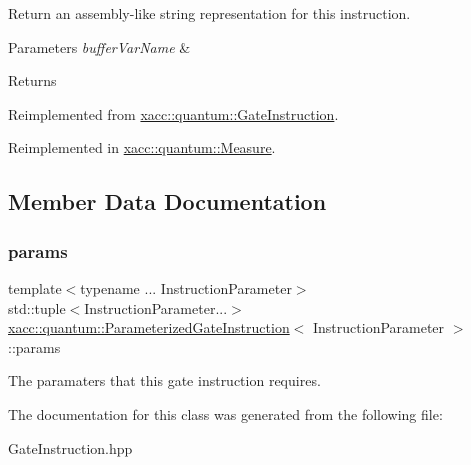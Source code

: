 Return an assembly-\/like string representation for this instruction.


\begin{DoxyParams}{Parameters}
{\em buffer\+Var\+Name} & \\
\hline
\end{DoxyParams}
\begin{DoxyReturn}{Returns}

\end{DoxyReturn}


Reimplemented from \hyperlink{a01276_a089a5da67ff40ac1a6f56e64589822d9}{xacc\+::quantum\+::\+Gate\+Instruction}.



Reimplemented in \hyperlink{a01312_a1c51a5d68294dcb2ba1a9fbea63a730f}{xacc\+::quantum\+::\+Measure}.



\subsection{Member Data Documentation}
\mbox{\label{a01280_ad33ab03e231b8e54cc1e087f08401e32}} 
\subsubsection{\texorpdfstring{params}{params}}
{\footnotesize\ttfamily template$<$typename ... Instruction\+Parameter$>$ \\
std\+::tuple$<$Instruction\+Parameter...$>$ \hyperlink{a01280}{xacc\+::quantum\+::\+Parameterized\+Gate\+Instruction}$<$ Instruction\+Parameter $>$\+::params\hspace{0.3cm}{\ttfamily [protected]}}

The paramaters that this gate instruction requires. 

The documentation for this class was generated from the following file\+:\begin{DoxyCompactItemize}
\item 
Gate\+Instruction.\+hpp\end{DoxyCompactItemize}

